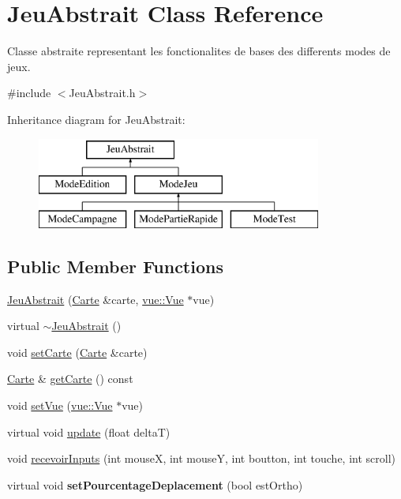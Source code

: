 \hypertarget{class_jeu_abstrait}{\section{Jeu\-Abstrait Class Reference}
\label{class_jeu_abstrait}
}


Classe abstraite representant les fonctionalites de bases des differents modes de jeux.  




{\ttfamily \#include $<$Jeu\-Abstrait.\-h$>$}

Inheritance diagram for Jeu\-Abstrait\-:\begin{figure}[H]
\begin{center}
\leavevmode
\includegraphics[height=3.000000cm]{class_jeu_abstrait}
\end{center}
\end{figure}
\subsection*{Public Member Functions}
\begin{DoxyCompactItemize}
\item 
\hyperlink{group__inf2990_ga24222f4c947cc57c4063bc4bdde23985}{Jeu\-Abstrait} (\hyperlink{class_carte}{Carte} \&carte, \hyperlink{classvue_1_1_vue}{vue\-::\-Vue} $\ast$vue)
\item 
virtual \hyperlink{group__inf2990_gaeaa1ca9db48bba9637245331fa257076}{$\sim$\-Jeu\-Abstrait} ()
\item 
void \hyperlink{group__inf2990_ga670cec0b00bf489f54a95f3362cd8584}{set\-Carte} (\hyperlink{class_carte}{Carte} \&carte)
\item 
\hyperlink{class_carte}{Carte} \& \hyperlink{group__inf2990_ga473ce72116fb23851e8da0bddfbc71d6}{get\-Carte} () const 
\item 
void \hyperlink{group__inf2990_gaeb3f920fd8f1163b527156a102a675b4}{set\-Vue} (\hyperlink{classvue_1_1_vue}{vue\-::\-Vue} $\ast$vue)
\item 
virtual void \hyperlink{group__inf2990_ga8aed09e66590b4f339b9290c8d3d70e6}{update} (float delta\-T)
\item 
void \hyperlink{group__inf2990_gac60bf135740871b1770283e508d263df}{recevoir\-Inputs} (int mouse\-X, int mouse\-Y, int boutton, int touche, int scroll)
\item 
\hypertarget{group__inf2990_ga2c3bb5664ace8e802d897a39f6801dab}{virtual void {\bfseries set\-Pourcentage\-Deplacement} (bool est\-Ortho)}\label{group__inf2990_ga2c3bb5664ace8e802d897a39f6801dab}

\end{DoxyCompactItemize}

